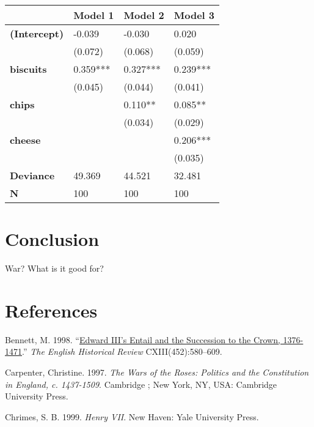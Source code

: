\documentclass[11pt,article,oneside]{memoir}
\newlength{\cslhangindent}
\newlength{\cslentryspacingunit} %
\newenvironment{CSLReferences}[2] %
 {%
  \setlength{\parindent}{0pt}
  \ifodd #1
  \let\oldpar\par
  \def\par{\hangindent=\cslhangindent\oldpar}
  \fi
  \setlength{\parskip}{#2\cslentryspacingunit}
 }%
 {}
\begin{document}
\begin{longtable}[]{@{}llll@{}}
\toprule()
& \textbf{Model 1} & \textbf{Model 2} & \textbf{Model 3} \\
\midrule()
\endhead
\textbf{(Intercept)} & -0.039 & -0.030 & 0.020 \\
& (0.072) & (0.068) & (0.059) \\
\textbf{biscuits} & 0.359*** & 0.327*** & 0.239*** \\
& (0.045) & (0.044) & (0.041) \\
\textbf{chips} & & 0.110** & 0.085** \\
& & (0.034) & (0.029) \\
\textbf{cheese} & & & 0.206*** \\
& & & (0.035) \\
\textbf{Deviance} & 49.369 & 44.521 & 32.481 \\
\textbf{N} & 100 & 100 & 100 \\
\bottomrule()
\end{longtable}

\hypertarget{conclusion}{%
\section{Conclusion}\label{conclusion}}

War? What is it good for?

\hypertarget{references}{%
\section{References}\label{references}}

\setlength{\parindent}{-0.2in}
\setlength{\leftskip}{0.2in}
\setlength{\parskip}{8pt}
\vspace*{-0.2in}

\noindent

\hypertarget{refs}{}
\begin{CSLReferences}{1}{0}
\leavevmode{}%
Bennett, M. 1998.
{``\href{https://doi.org/10.1093/ehr/CXIII.452.580}{Edward {III}'s
{Entail} and the {Succession} to the {Crown}, 1376-1471}.''} \emph{The
English Historical Review} CXIII(452):580--609.

\leavevmode{}%
Carpenter, Christine. 1997. \emph{The {Wars} of the {Roses}: Politics
and the Constitution in {England}, c. 1437-1509}. {Cambridge ; New York,
NY, USA}: {Cambridge University Press}.

\leavevmode{}%
Chrimes, S. B. 1999. \emph{Henry {VII}}. {New Haven}: {Yale University
Press}.

\end{CSLReferences}
\end{document}
